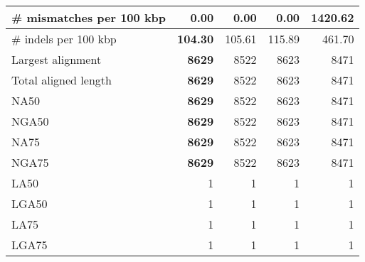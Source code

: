 \documentclass[12pt,a4paper]{article}
\begin{document}
\begin{table}[ht]
\begin{center}
\begin{tabular}{|l*{4}{|r}|}
\# mismatches per 100 kbp & {\bf 0.00} & {\bf 0.00} & {\bf 0.00} & 1420.62 \\ \hline
\# indels per 100 kbp & {\bf 104.30} & 105.61 & 115.89 & 461.70 \\ \hline
Largest alignment & {\bf 8629} & 8522 & 8623 & 8471 \\ \hline
Total aligned length & {\bf 8629} & 8522 & 8623 & 8471 \\ \hline
NA50 & {\bf 8629} & 8522 & 8623 & 8471 \\ \hline
NGA50 & {\bf 8629} & 8522 & 8623 & 8471 \\ \hline
NA75 & {\bf 8629} & 8522 & 8623 & 8471 \\ \hline
NGA75 & {\bf 8629} & 8522 & 8623 & 8471 \\ \hline
LA50 & 1 & 1 & 1 & 1 \\ \hline
LGA50 & 1 & 1 & 1 & 1 \\ \hline
LA75 & 1 & 1 & 1 & 1 \\ \hline
LGA75 & 1 & 1 & 1 & 1 \\ \hline
\end{tabular}
\end{center}
\end{table}
\end{document}
